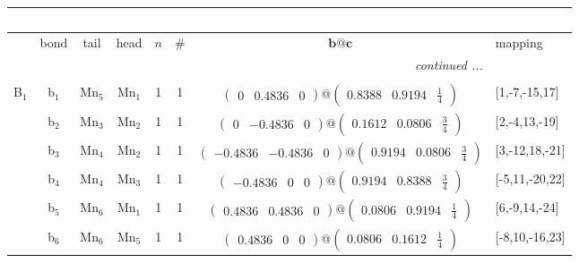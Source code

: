 \documentclass[fleqn,10pt,landscape]{article}
\begin{document}
\begin{itemize}
\begin{center}
\begin{longtable}{cc|cc|c|c|c|l}
\multicolumn{7}{l}{\tablename\ \thetable{}} \\
 \hline \hline
 & bond & tail & head & $n$ & \# & $\bm{b}@\bm{c}$ & mapping \\ \hline \endhead

 \hline \hline
\multicolumn{7}{r}{\footnotesize\it continued ...} \\ \endfoot

 \hline \hline
\multicolumn{7}{r}{} \\ \endlastfoot

B$_{1}$ & b$_{1}$ & Mn$_{5}$ & Mn$_{1}$ & 1 & 1 & $\begin{pmatrix} 0 & 0.4836 & 0 \end{pmatrix}@\begin{pmatrix} 0.8388 & 0.9194 & \frac{1}{4} \end{pmatrix}$ & [1,-7,-15,17] \\
& b$_{2}$ & Mn$_{3}$ & Mn$_{2}$ & 1 & 1 & $\begin{pmatrix} 0 & -0.4836 & 0 \end{pmatrix}@\begin{pmatrix} 0.1612 & 0.0806 & \frac{3}{4} \end{pmatrix}$ & [2,-4,13,-19] \\
& b$_{3}$ & Mn$_{4}$ & Mn$_{2}$ & 1 & 1 & $\begin{pmatrix} -0.4836 & -0.4836 & 0 \end{pmatrix}@\begin{pmatrix} 0.9194 & 0.0806 & \frac{3}{4} \end{pmatrix}$ & [3,-12,18,-21] \\
& b$_{4}$ & Mn$_{4}$ & Mn$_{3}$ & 1 & 1 & $\begin{pmatrix} -0.4836 & 0 & 0 \end{pmatrix}@\begin{pmatrix} 0.9194 & 0.8388 & \frac{3}{4} \end{pmatrix}$ & [-5,11,-20,22] \\
& b$_{5}$ & Mn$_{6}$ & Mn$_{1}$ & 1 & 1 & $\begin{pmatrix} 0.4836 & 0.4836 & 0 \end{pmatrix}@\begin{pmatrix} 0.0806 & 0.9194 & \frac{1}{4} \end{pmatrix}$ & [6,-9,14,-24] \\
& b$_{6}$ & Mn$_{6}$ & Mn$_{5}$ & 1 & 1 & $\begin{pmatrix} 0.4836 & 0 & 0 \end{pmatrix}@\begin{pmatrix} 0.0806 & 0.1612 & \frac{1}{4} \end{pmatrix}$ & [-8,10,-16,23] \\ \hline

\end{longtable}
\end{center}
\end{itemize}
\end{document}
